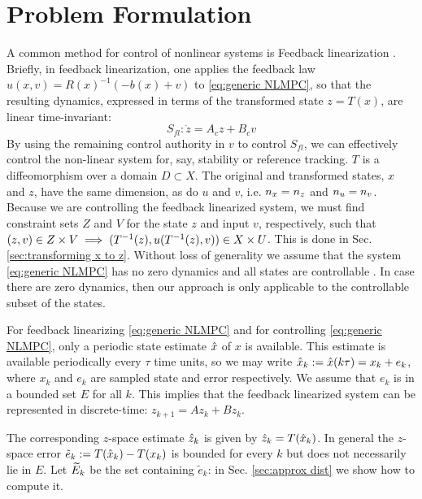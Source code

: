 \section{Problem Formulation} 
\label{sec:formulation}
A common method for control of nonlinear systems is Feedback linearization \cite{khalil}. 
Briefly, in feedback linearization, one applies the feedback law $u(x,v) = R(x)^{-1}(-b(x)+v)$ to \eqref{eq:generic NLMPC}, so that the resulting dynamics, expressed in terms of the transformed state $z = T(x)$, are linear time-invariant:
\begin{equation}
\label{eq:LTI_fb_lin}
S_{fl}: \dot{z} = A_cz + B_cv
\end{equation}
By using the remaining control authority in $v$ to control $S_{fl}$, we can effectively control the non-linear system for, say, stability or reference tracking.
$T$ is a diffeomorphism \cite{khalil} over a domain $D \subset X$.
The original and transformed states, $x$ and $z$, have the same dimension, as do $u$ and $v$, i.e. $n_x = n_z$ and $n_u = n_v$.
Because we are controlling the feedback linearized system, we must find constraint sets $Z$ and $V$ for the state $z$ and input $v$, respectively, such that $(z,v) \in Z\times V \implies (T^{-1}(z), u(T^{-1}(z), v)) \in X \times U$.
This is done in Sec. \ref{sec:transforming x to z}.
Without loss of generality we assume that the system \eqref{eq:generic NLMPC} has no zero dynamics and all states are controllable \cite{khalil}. In case there are zero dynamics, then our approach is only applicable to the controllable subset of the states.

For feedback linearizing \eqref{eq:generic NLMPC} and for controlling \eqref{eq:generic NLMPC}, only a periodic state estimate $\hat{x}$ of $x$ is available.
This estimate is available periodically every $\tau$ time units, so we may write $\hat{x}_{k} := \hat{x}(k\tau) = x_k + e_k$, where $x_k$ and $e_k$ are sampled state and error respectively.
We assume that $e_k$ is in a bounded set $E$ for all $k$.
This implies that the feedback linearized system can be represented in discrete-time: $z_{k+1} = Az_k + B z_k$.

The corresponding $z$-space estimate $\hat{z}_{k}$ is given by $\hat{z}_{k} = T(\hat{x}_{k})$.
In general the $z$-space error $\tilde{e}_k := T(\hat{x}_k) - T(x_k)$ is bounded for every $k$ but does not necessarily lie in $E$.
Let $\widetilde{E}_{k}$ be the set containing $\tilde{e}_k$: in Sec. \ref{sec:approx dist} we show how to compute it.

